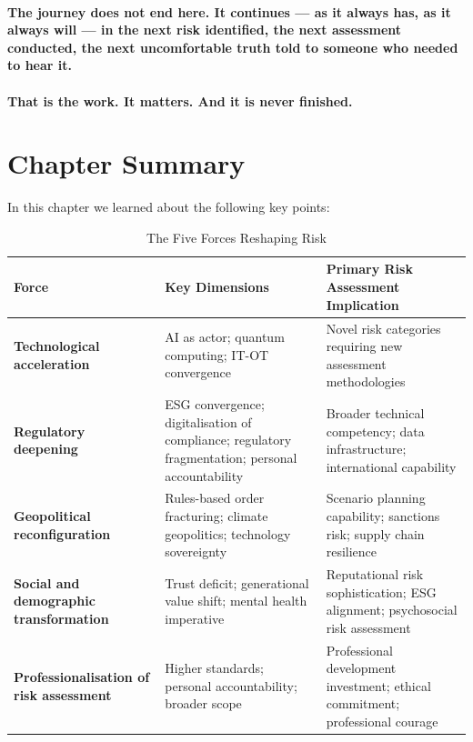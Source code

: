 \paragraph{The journey does not end here. It continues — as it always has, as it always will — in the next risk identified, the next assessment conducted, the next uncomfortable truth told to someone who needed to hear it.}
\paragraph{That is the work. It matters. And it is never finished.}

\newpage
\section{Chapter Summary}
In this chapter we learned about the following key points:

\begin{table}[H]
  \centering
  \renewcommand{\arraystretch}{1.5}
  \begin{tabularx}{\textwidth}{ | >{\raggedright\arraybackslash}p{} 
								| >{\raggedright\arraybackslash}p{} 
                                | >{\raggedright\arraybackslash}X | }
    \hline
    \textbf{Force} & \textbf{Key Dimensions} & \textbf{Primary Risk Assessment Implication} \\
    \hline
    \textbf{Technological acceleration} & AI as actor; quantum computing; IT-OT convergence & Novel risk categories requiring new assessment methodologies\\
    \hline
    \textbf{Regulatory deepening} & ESG convergence; digitalisation of compliance; regulatory fragmentation; personal accountability & Broader technical competency; data infrastructure; international capability\\
    \hline
    \textbf{Geopolitical reconfiguration} & Rules-based order fracturing; climate geopolitics; technology sovereignty & Scenario planning capability; sanctions risk; supply chain resilience\\
    \hline
    \textbf{Social and demographic transformation} & Trust deficit; generational value shift; mental health imperative & Reputational risk sophistication; ESG alignment; psychosocial risk assessment\\
    \hline
    \textbf{Professionalisation of risk assessment} & Higher standards; personal accountability; broader scope & Professional development investment; ethical commitment; professional courage\\
    \hline
  \end{tabularx}
  \caption{The Five Forces Reshaping Risk}
\end{table}

